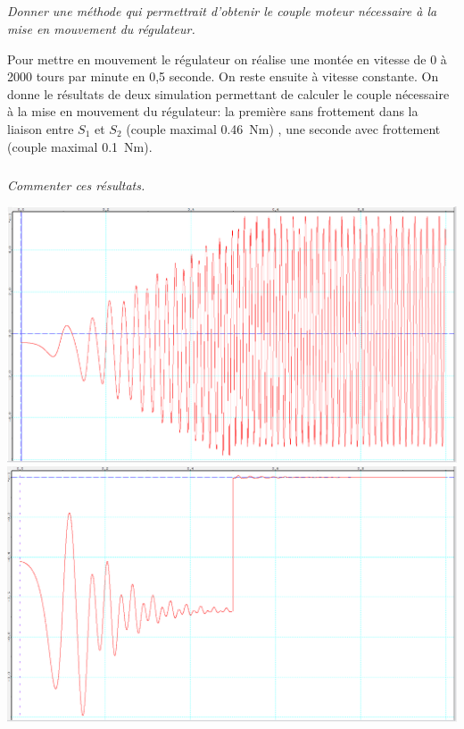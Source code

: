 \documentclass[10pt,fleqn]{article} %
\begin{document}
\begin{multicols}{2}
\subparagraph{}\textit{Donner une méthode qui permettrait d'obtenir le couple moteur nécessaire à la mise en mouvement du régulateur.}

Pour mettre en mouvement le régulateur on réalise une montée en vitesse de 0 à 2000 tours par minute en 0,5 seconde.  On reste ensuite à vitesse constante. On donne le résultats de deux simulation permettant de calculer le couple nécessaire à la mise en mouvement du régulateur: la première sans frottement dans la liaison entre $S_1$ et $S_2$ (couple maximal \SI{0,46}{Nm}) , une seconde avec frottement (couple maximal \SI{0,1}{Nm}). 

\subparagraph{}\textit{Commenter ces résultats. }



\ifprof
\else
\end{multicols}
\fi

\begin{center}
\includegraphics[width=.48\linewidth]{images/Cm_SansFrottement.png}
\includegraphics[width=.48\linewidth]{images/Cm_Frottement.png}
\end{center}


\end{document}
